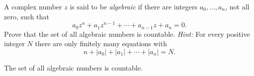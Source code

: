 \begin{exercise}
	A complex number $z$ is said to be \textit{algebraic} if there are integers $a_0,\ldots,a_n$, not all zero, such that
	\begin{equation*}
	a_0z^n + a_1z^{n-1} + \cdots + a_{n-1}z + a_n = 0.
	\end{equation*}
	Prove that the set of all algebraic numbers is countable. \textit{Hint:} For every positive integer $N$ there are only finitely many equations with
	\begin{equation*}
	n + |a_0| + |a_1| + \cdots + |a_n| = N.
	\end{equation*}
\end{exercise}
\begin{proposition}
	The set of all algebraic numbers is countable.
\end{proposition}
